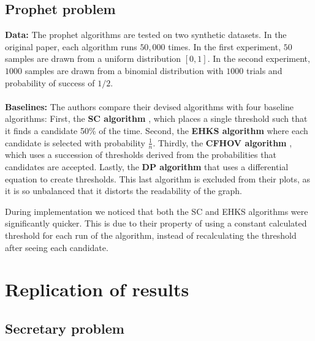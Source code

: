 \subsection{Prophet problem}
\textbf{Data:} 
The prophet algorithms are tested on two synthetic datasets. In the original paper, each algorithm runs $50,000$ times. In the first experiment, $50$ samples are drawn from a uniform distribution $[0,1]$. In the second experiment, $1000$ samples are drawn from a binomial distribution with $1000$ trials and probability of success of $1/2$.
\\ \\
\textbf{Baselines:}
The authors compare their devised algorithms with four baseline algorithms: First, the \textbf{SC algorithm} \cite{SamualCahn1984}, which places a single threshold such that it finds a candidate 50\% of the time. Second, the \textbf{EHKS algorithm }\cite{Ehsani2017} where each candidate is selected with probability $\frac{1}{n}$. Thirdly,  the \textbf{CFHOV algorithm} \cite{correa21b}, which uses a succession of thresholds derived from the probabilities that  candidates are accepted. Lastly, the \textbf{DP algorithm} \cite{Chow1971} that uses a differential equation to create thresholds. This last algorithm is excluded from their plots, as it is so unbalanced that it distorts the readability of the graph.

During implementation we noticed that both the SC and EHKS algorithms were significantly quicker. This is due to their property of using a constant calculated threshold for each run of the algorithm, instead of recalculating the threshold after seeing each candidate.

\section{Replication of results}

\subsection{Secretary problem}

